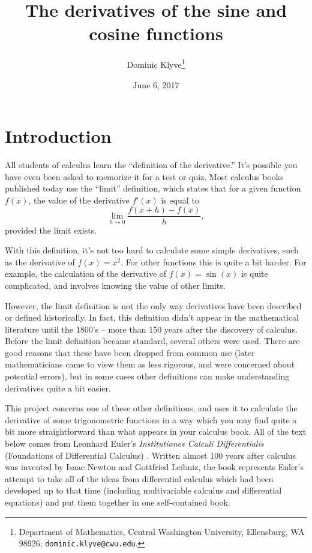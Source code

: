 \documentclass[11pt]{article}
\begin{document}
\title{The derivatives of the sine and cosine functions}
\author{Dominic Klyve\thanks{Department of Mathematics, Central Washington University, Ellensburg, WA  98926; \texttt{dominic.klyve@cwu.edu}.}}
\date{June 6, 2017}
\bigskip

\maketitle
\thispagestyle{fancy}

\vspace*{-12pt}

\section*{Introduction}

All students of calculus  learn the ``definition of the derivative.''  It's possible you have even been asked to memorize it for a test or quiz.  Most calculus books published today use the ``limit'' definition, which states that for a given function $f(x)$, the value of the derivative $f’(x)$ is equal to
$$
\lim_{h \to 0} \frac{f(x+h) - f(x)}{h},
$$
provided the limit exists.

With this definition, it's not too hard to calculate some simple derivatives, such as  the derivative of $f(x) = x^2$.  For other functions this is quite a bit harder.  For example, the calculation of the derivative of $f(x) = \sin(x)$ is quite complicated, and involves knowing the value of other limits.

However, the limit definition is not the only way derivatives have been described or defined historically.  In fact, this definition didn't appear in the mathematical literature until the 1800's -- more than 150 years after the discovery of calculus.  Before the limit definition became standard, several others were used.  There are good reasons that these have been dropped from common use (later mathematicians came to view them as less rigorous, and were concerned about potential errors), but in some cases other definitions can make understanding derivatives quite a bit easier.

This project concerns one of these other definitions, and uses it to calculate the derivative of some trigonometric functions in a way which you may find quite a bit more straightforward than what appears in your calculus book.  All of the text below comes from Leonhard Euler's \emph{Institutiones Calculi Differentialis} (Foundations of Differential Calculus) \citep{E212}. Written almost 100 years after calculus was invented by Isaac Newton and Gottfried Leibniz, the book represents Euler's attempt to take all of the ideas from differential calculus which had been developed up to that time (including multivariable calculus and differential equations) and put them together in one self-contained book.
\end{document}
